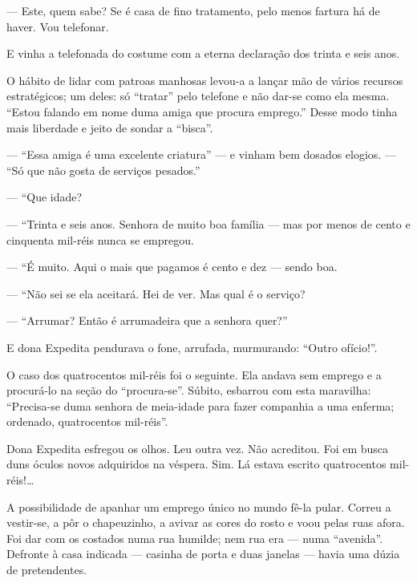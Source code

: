 
--- Este, quem sabe? Se é casa de fino tratamento, pelo menos fartura há
de haver. Vou telefonar.

E vinha a telefonada do costume com a eterna declaração dos trinta e
seis anos.

O hábito de lidar com patroas manhosas levou-a a lançar mão de vários
recursos estratégicos; um deles: só ``tratar'' pelo telefone e não
dar-se como ela mesma. ``Estou falando em nome duma amiga que procura
emprego.'' Desse modo tinha mais liberdade e jeito de sondar a
``bisca''.

--- ``Essa amiga é uma excelente criatura'' --- e vinham bem dosados
elogios. --- ``Só que não gosta de serviços pesados.''

--- ``Que idade?

--- ``Trinta e seis anos. Senhora de muito boa família --- mas por menos
de cento e cinquenta mil-réis nunca se empregou.

--- ``É muito. Aqui o mais que pagamos é cento e dez --- sendo boa.

--- ``Não sei se ela aceitará. Hei de ver. Mas qual é o serviço?


--- ``Arrumar? Então é arrumadeira que a senhora quer?''

E dona Expedita pendurava o fone, arrufada, murmurando: ``Outro
ofício!''.

O caso dos quatrocentos mil-réis foi o seguinte. Ela andava sem emprego
e a procurá-lo na seção do ``procura-se''. Súbito, esbarrou com esta
maravilha: ``Precisa-se duma senhora de meia-idade para fazer companhia
a uma enferma; ordenado, quatrocentos mil-réis''.

Dona Expedita esfregou os olhos. Leu outra vez. Não acreditou. Foi em
busca duns óculos novos adquiridos na véspera. Sim. Lá estava escrito
quatrocentos mil-réis!\ldots{}

A possibilidade de apanhar um emprego único no mundo fê-la pular. Correu
a vestir-se, a pôr o chapeuzinho, a avivar as cores do rosto e voou
pelas ruas afora. Foi dar com os costados numa rua humilde; nem rua era
--- numa ``avenida''. Defronte à casa indicada --- casinha de porta e
duas janelas --- havia uma dúzia de pretendentes.

